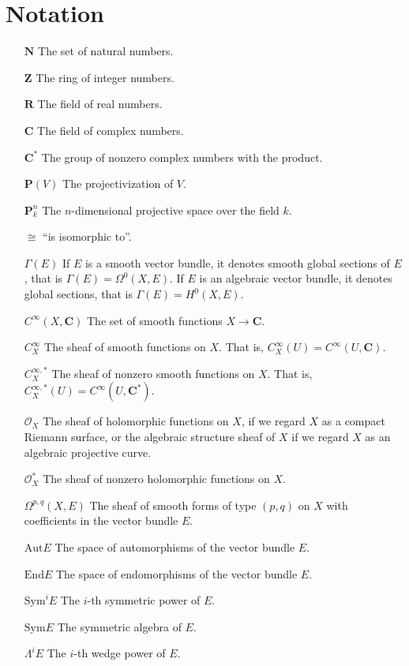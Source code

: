 \documentclass[12pt,a4paper]{book}
\theoremstyle{definition} \newtheorem{defn}[thm]{Definition}
\theoremstyle{definition} \newtheorem{ejemplo}[thm]{Example}
\theoremstyle{remark} \newtheorem{rem}[thm]{Remark}
\def\OO{\mathscr{O}}
\def\CC{\mathbf{C}}
\def\ZZ{\mathbf{Z}}
\def\RR{\mathbf{R}}
\def\NN{\mathbf{N}}
\def\PP{\mathbf{P}}
\def\End{\mathrm{End}}
\def\Aut{\mathrm{Aut}}
\def\Sym{\mathrm{Sym}}
\begin{document}
\chapter*{Notation}
\begin{itemize}
  \item[$\NN$] The set of natural numbers.
  \item[$\ZZ$] The ring of integer numbers.
  \item[$\RR$] The field of real numbers.
  \item[$\CC$] The field of complex numbers.
  \item[$\CC^*$] The group of nonzero complex numbers with the product.
  \item[$\PP(V)$] The projectivization of $V$.
  \item[$\PP^n_k$] The $n$-dimensional projective space over the field $k$.

  \item[$\cong$]  ``is isomorphic to''.

  \item[$\Gamma(E)$]  If $E$ is a smooth vector bundle, it denotes smooth global sections of $E$, that is $\Gamma(E)=\Omega^0(X,E)$. If $E$ is an algebraic vector bundle, it denotes global sections, that is $\Gamma(E)=H^0(X,E)$.

  \item[$C^\infty(X,\CC)$]  The set of smooth functions $X\rightarrow \CC$.

  \item[$C^\infty_X$]  The sheaf of smooth functions on $X$. That is, $C^\infty_X(U)=C^\infty(U,\CC)$.

  \item[$C^{\infty,*}_X$]  The sheaf of nonzero smooth functions on $X$. That is, $C^{\infty,*}_X(U)=C^\infty(U,\CC^*)$.


  \item[$\OO_X$] The sheaf of holomorphic functions on $X$, if we regard $X$ as a compact Riemann surface, or the algebraic structure sheaf of $X$ if we regard $X$ as an algebraic projective curve.

  \item[$\OO_X^*$] The sheaf of nonzero holomorphic functions on $X$.

  \item[$\Omega^{p,q}(X,E)$] The sheaf of smooth forms of type $(p,q)$ on $X$ with coefficients in the vector bundle $E$.

  \item[$\Aut E$] The space of automorphisms of the vector bundle $E$.

  \item[$\End E$] The space of endomorphisms of the vector bundle $E$.

  \item[$\Sym^i E$] The $i$-th symmetric power of $E$.

  \item[$\Sym E$] The symmetric algebra of $E$.

  \item[$ \Lambda^i E$] The $i$-th wedge power of $E$.

\end{itemize}
\end{document}

